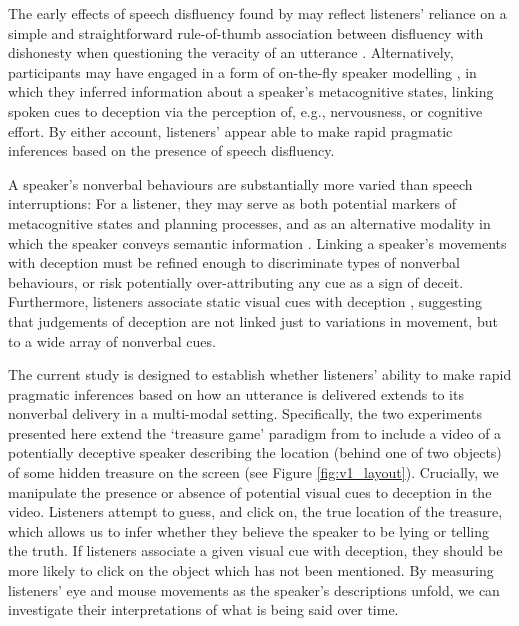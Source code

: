\documentclass[a4paper,man,natbib]{apa6}
\begin{document}
The early effects of speech disfluency found by \citeauthor{Loy2017} may reflect listeners' reliance on a simple and straightforward rule-of-thumb association between disfluency with dishonesty when questioning the veracity of an utterance \citep[See][]{DePaulo1982}.
Alternatively, participants may have engaged in a form of on-the-fly speaker modelling \citep[See][]{King2018}, in which they inferred information about a speaker's metacognitive states, linking spoken cues to deception via the perception of, e.g., nervousness, or cognitive effort. 
By either account, listeners' appear able to make rapid pragmatic inferences based on the presence of speech disfluency.

A speaker's nonverbal behaviours are substantially more varied than speech interruptions: For a listener, they may serve as both potential markers of metacognitive states and planning processes, and as an alternative modality in which the speaker conveys semantic information \citep[See, e.g.][]{Ekman1969,Mcneill1992}. 
Linking a speaker's movements with deception must be refined enough to discriminate types of nonverbal behaviours, or risk potentially over-attributing any cue as a sign of deceit.
Furthermore, listeners associate static visual cues with deception \citep[e.g. eye gaze,][]{Zuckerman1981a}, suggesting that judgements of deception are not linked just to variations in movement, but to a wide array of nonverbal cues. 

The current study is designed to establish whether listeners' ability to make rapid pragmatic inferences based on how an utterance is delivered extends to its nonverbal delivery in a multi-modal setting.
Specifically, the two experiments presented here extend the `treasure game' paradigm from \citet{Loy2017} to include a video of a potentially deceptive speaker describing the location (behind one of two objects) of some hidden treasure on the screen (see Figure \ref{fig:v1_layout}).
Crucially, we manipulate the presence or absence of potential visual cues to deception in the video.
Listeners attempt to guess, and click on, the true location of the treasure, which allows us to infer whether they believe the speaker to be lying or telling the truth.
If listeners associate a given visual cue with deception, they should be more likely to click on the object which has not been mentioned.
By measuring listeners' eye  and mouse movements as the speaker's descriptions unfold, we can investigate their interpretations of what is being said over time.
\end{document}

